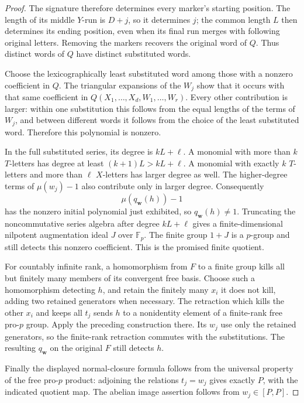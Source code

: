 \documentclass[11pt]{article}
\theoremstyle{definition}\newtheorem{definition}[theorem]{Definition}
\begin{document}
\begin{proof}
The signature therefore determines every marker's starting
position.  The length of its middle $Y$-run is $D+j$, so it
determines $j$; the common length $L$ then determines its
ending position, even when its final run merges with
following original letters.  Removing the markers recovers
the original word of $Q$.  Thus distinct words of $Q$ have
distinct substituted words.

Choose the lexicographically least substituted word among
those with a nonzero coefficient in $Q$.
The triangular expansions of the $W_j$ show that it occurs
with that same coefficient in $Q(X_1,\ldots,X_d,W_1,\ldots,W_r)$.
Every other contribution is larger: within one substitution
this follows from the equal lengths of the terms of $W_j$,
and between different words it follows from the choice of
the least substituted word.  Therefore this polynomial is
nonzero.

In the full substituted series, its degree is $kL+\ell$.
A monomial with more than $k$ $T$-letters has degree at least
$(k+1)L>kL+\ell$.  A monomial with exactly $k$ $T$-letters
and more than $\ell$ $X$-letters has larger degree as well.
The higher-degree terms of $\mu(w_j)-1$ also contribute
only in larger degree.  Consequently
\[
 \mu(q_{\boldsymbol w}(h))-1
\]
has the nonzero initial polynomial just exhibited, so
$q_{\boldsymbol w}(h)\ne1$.
Truncating the noncommutative series algebra after degree
$kL+\ell$ gives a finite-dimensional nilpotent augmentation
ideal $J$ over $\mathbb F_p$.
The finite group $1+J$ is a $p$-group and still detects this
nonzero coefficient.  This is the promised finite quotient.

For countably infinite rank, a homomorphism from $F$ to a
finite group kills all but finitely many members of its
convergent free basis.  Choose such a homomorphism detecting
$h$, and retain the finitely many $x_i$ it does not kill,
adding two retained generators when necessary.  The
retraction which kills the other $x_i$ and keeps all $t_j$
sends $h$ to a nonidentity element of a finite-rank free
pro-$p$ group.  Apply the preceding construction there.
Its $w_j$ use only the retained generators, so the finite-rank
retraction commutes with the substitutions.  The resulting
$q_{\boldsymbol w}$ on the original $F$ still detects $h$.

Finally the displayed normal-closure formula follows from
the universal property of the free pro-$p$ product: adjoining
the relations $t_j=w_j$ gives exactly $P$, with the indicated
quotient map.  The abelian image assertion follows from
$w_j\in[P,P]$.
\end{proof}
\end{document}
